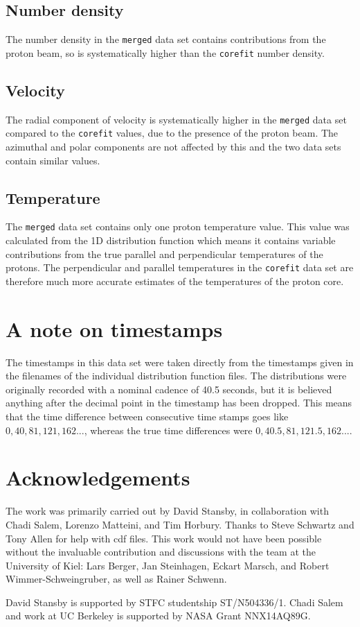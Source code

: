 \documentclass[11pt,a4paper]{article}
\begin{document}
\subsection{Number density}
The number density in the \texttt{merged} data set contains contributions from the proton beam, so is systematically higher than the \texttt{corefit} number density.
\subsection{Velocity}
The radial component of velocity is systematically higher in the \texttt{merged} data set compared to the \texttt{corefit} values, due to the presence of the proton beam. The azimuthal and polar components are not affected by this and the two data sets contain similar values.
\subsection{Temperature}
The \texttt{merged} data set contains only one proton temperature value. This value was calculated from the 1D distribution function which means it contains variable contributions from the true parallel and perpendicular temperatures of the protons. The perpendicular and parallel temperatures in the \texttt{corefit} data set are therefore much more accurate estimates of the temperatures of the proton core.

\section{A note on timestamps}
The timestamps in this data set were taken directly from the timestamps given in the filenames of the individual distribution function files. The distributions were originally recorded with a nominal cadence of 40.5 seconds, but it is believed anything after the decimal point in the timestamp has been dropped. This means that the time difference between consecutive time stamps goes like $0, 40, 81, 121, 162...$, whereas the true time differences were $0, 40.5, 81, 121.5, 162...$.
\appendix
\section{Acknowledgements}
The work was primarily carried out by David Stansby, in collaboration with Chadi Salem, Lorenzo Matteini, and Tim Horbury. Thanks to Steve Schwartz and Tony Allen for help with cdf files. This work would not have been possible without the invaluable contribution and discussions with the team at the University of Kiel: Lars Berger, Jan Steinhagen, Eckart Marsch, and Robert Wimmer-Schweingruber, as well as Rainer Schwenn.

David Stansby is supported by STFC studentship ST/N504336/1. Chadi Salem and work at UC Berkeley is supported by NASA Grant NNX14AQ89G. 
\end{document}
